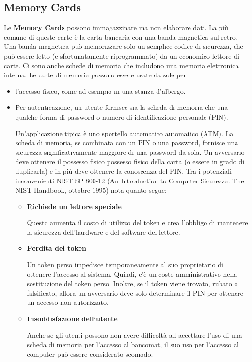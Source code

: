 \subsection{Memory Cards}
Le \textbf{Memory Cards} possono immagazzinare ma non elaborare dati.
\singlespacing
La più comune di queste carte è la carta bancaria con una banda magnetica sul retro. Una banda magnetica può memorizzare solo un semplice codice di sicurezza, che può essere letto (e sfortunatamente riprogrammato) da un economico lettore di carte. Ci sono anche schede di memoria che includono una memoria elettronica interna. Le carte di memoria possono essere usate da sole per
\begin{itemize}
    \item l'accesso fisico, come ad esempio in una stanza d'albergo.
    \item Per autenticazione, un utente fornisce sia la scheda di memoria che una qualche forma di password o numero di identificazione personale (PIN).
    
    Un'applicazione tipica è uno sportello automatico automatico (ATM). La scheda di memoria, se combinata con un PIN o una password, fornisce una sicurezza significativamente maggiore di una password da sola. Un avversario deve ottenere il possesso fisico possesso fisico della carta (o essere in grado di duplicarla) e in più deve ottenere la conoscenza del PIN. 
    \singlespacing
    Tra i potenziali inconvenienti NIST SP 800-12 (An Introduction to Computer Sicurezza: The NIST Handbook, ottobre 1995) nota quanto segue:
    \begin{itemize}
        \item \textbf{Richiede un lettore speciale}
        
        Questo aumenta il costo di utilizzo del token e crea l'obbligo di mantenere la sicurezza dell'hardware e del software del lettore.
        
        \item \textbf{Perdita dei token} 
        
        Un token perso impedisce temporaneamente al suo proprietario di ottenere l'accesso al sistema. Quindi, c'è un costo amministrativo nella sostituzione del token perso. Inoltre, se il token viene trovato, rubato o falsificato, allora un avversario deve solo determinare il PIN per ottenere un accesso non autorizzato.
        
        \item \textbf{Insoddisfazione dell'utente}
        
        Anche se gli utenti possono non avere difficoltà ad accettare l'uso di una scheda di memoria per l'accesso al bancomat, il suo uso per l'accesso al computer può essere considerato scomodo.
    \end{itemize}
\end{itemize}
\newpage
